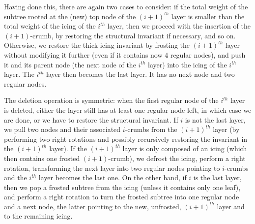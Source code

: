 \documentclass[11pt]{article}
\begin{document}
Having done this, there are again two cases to consider: if the total
weight of the subtree rooted at the (new) top node of the $(i+1)^{th}$
layer is smaller than the total weight of the icing of the $i^{th}$
layer, then we proceed with the insertion of the $(i+1)$-crumb, by
restoring the structural invariant if necessary, and so on. Otherwise, we restore
the thick icing invariant by frosting the
$(i+1)^{th}$ layer without modifying it further (even if it contains now
4 regular nodes), and push it and its parent node (the next node of the
$i^{th}$ layer) into the icing of the $i^{th}$ layer. The $i^{th}$ layer
then becomes the last layer. It has no next node and two regular nodes.

The deletion operation is symmetric: when the first regular node of the
$i^{th}$ layer is deleted, either the layer still has at least one
regular node left, in which case we are done, or we have to restore the
structural invariant.  If $i$ is not the last layer, we pull two nodes and their
associated $i$-crumbs from the $(i+1)^{th}$ layer (by performing two
right rotations and possibly recursively restoring the invariant in the
$(i+1)^{th}$ layer).  If the $(i+1)^{th}$ layer is only composed of an
icing (which then contains one frosted $(i+1)$-crumb), we defrost the
icing, perform a right rotation, transforming the next layer into two
regular nodes pointing to $i$-crumbs and the $i^{th}$ layer becomes the
last one.  On the other hand, if $i$ is the last layer, then we pop a
frosted subtree from the icing (unless it contains only one leaf), and
perform a right rotation to turn the frosted subtree into one regular
node and a next node, the latter pointing to the new, unfrosted,
$(i+1)^{th}$ layer and to the remaining icing.
\end{document}
